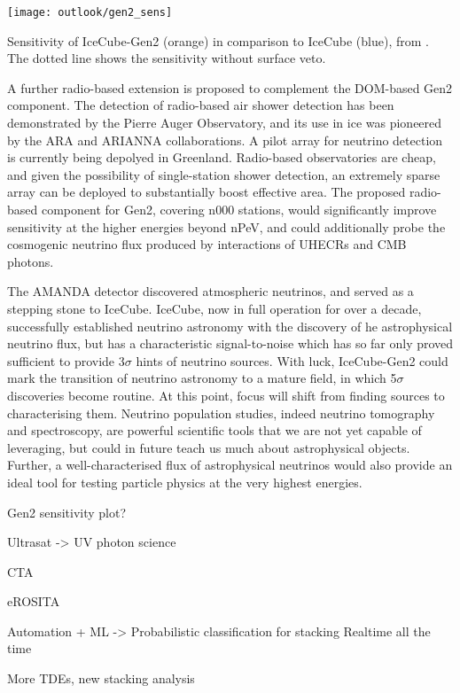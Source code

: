 \begin{marginfigure}
	\centering \texttt{[image: outlook/gen2\_sens]}
	\caption{Sensitivity of IceCube-Gen2 (orange) in comparison to IceCube (blue), from \cite{gen2_icrc}. The dotted line shows the sensitivity without surface veto.} 
	\label{fig:gen2_sens}
\end{marginfigure}

A further radio-based extension is proposed to complement the DOM-based Gen2 component. The detection of radio-based air shower detection has been demonstrated by the Pierre Auger Observatory, and its use in ice was pioneered by the ARA and ARIANNA collaborations. A pilot array for neutrino detection is currently being depolyed in Greenland. Radio-based observatories are cheap, and given the possibility of single-station shower detection, an extremely sparse array can be deployed to substantially boost effective area. The proposed radio-based component for Gen2, covering n000 stations, would significantly improve sensitivity at the higher energies beyond nPeV, and could additionally probe the cosmogenic neutrino flux produced by interactions of UHECRs and CMB photons.

The AMANDA detector discovered atmospheric neutrinos, and served as a stepping stone to IceCube. IceCube, now in full operation for over a decade, successfully established neutrino astronomy with the discovery of he astrophysical neutrino flux, but has a characteristic signal-to-noise which has so far only proved sufficient to provide 3$\sigma$ hints of neutrino sources. With luck, IceCube-Gen2 could mark the transition of neutrino astronomy to a mature field, in which 5$\sigma$ discoveries become routine. At this point, focus will shift from finding sources to characterising them. Neutrino population studies, indeed neutrino tomography and spectroscopy, are powerful scientific tools that we are not yet capable of leveraging, but could in future teach us much about astrophysical objects. Further, a well-characterised flux of astrophysical neutrinos would also provide an ideal tool for testing particle physics at the very highest energies.

Gen2 sensitivity plot?

Ultrasat -> UV photon science

CTA

eROSITA

Automation + ML -> Probabilistic classification for stacking
Realtime all the time

More TDEs, new stacking analysis